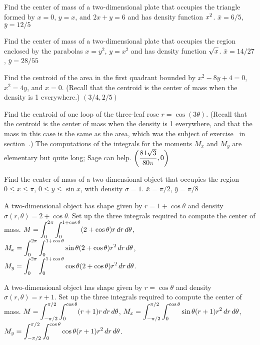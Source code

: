 \exercise Find the center of mass of a two-dimensional plate 
that occupies the triangle formed by $x=0$, $y=x$, and $2x+y=6$
and has density
function $\displaystyle x^2$.
\answer $\bar x=6/5$, $\bar y=12/5$
\endanswer
\endexercise

\exercise Find the center of mass of a two-dimensional plate 
that occupies the region enclosed by the parabolas $x=y^2$, $y=x^2$
and has density
function $\displaystyle\sqrt{x}$.
\answer $\bar x=14/27$, $\bar y=28/55$
\endanswer
\endexercise

\exercise Find the centroid of the area in the first quadrant bounded by
 $x^2-8y+4=0$, $x^2=4y$, and $x=0$. (Recall that the centroid
is the center of mass when the density is 1 everywhere.)
\answer $(3/4,2/5)$
\endanswer
\endexercise

\exercise Find the centroid of one loop of the three-leaf rose
$r=\cos(3\theta)$.  (Recall that the centroid is the
center of mass when the density is 1 everywhere, and that the mass in
this case is the same as the area, which was the subject of
exercise~ in
section~.)  The
computations of the integrals for the moments $M_x$ and $M_y$ are
elementary but quite long; Sage can help.
\answer $\displaystyle\left({81\sqrt3\over80\pi},0\right)$
\endanswer

\endexercise

\exercise Find the center of mass of a two dimensional
object that occupies the region $0\le x\le \pi$, $0\le y\le \sin x$,
with density $\sigma=1$.
\answer $\bar x=\pi/2$, $\bar y=\pi/8$ 
\endanswer
\endexercise

\exercise A two-dimensional object has shape given by 
$r=1+\cos\theta$ and density $\sigma(r,\theta)=2+\cos\theta$. Set up
the three integrals required to compute the center of mass.
\answer $\displaystyle M=\int_0^{2\pi} \int_0^{1+\cos\theta} (2+\cos\theta)r\,dr\,d\theta$,
\hfill\break
$\displaystyle M_x=\int_0^{2\pi} \int_0^{1+\cos\theta} \sin\theta(2+\cos\theta)r^2\,dr\,d\theta$,
\hfill\break
$\displaystyle M_y=\int_0^{2\pi} \int_0^{1+\cos\theta} \cos\theta(2+\cos\theta)r^2\,dr\,d\theta$.
\endanswer
\endexercise

\exercise A two-dimensional object has shape given by 
$r=\cos\theta$ and density $\sigma(r,\theta)=r+1$. Set up
the three integrals required to compute the center of mass.
\answer $\displaystyle M=\int_{-\pi/2}^{\pi/2} \int_0^{\cos\theta} (r+1)r\,dr\,d\theta$,
\hfill\break
$\displaystyle M_x=\int_{-\pi/2}^{\pi/2} \int_0^{\cos\theta} \sin\theta(r+1)r^2\,dr\,d\theta$,
\hfill\break
$\displaystyle M_y=\int_{-\pi/2}^{\pi/2} \int_0^{\cos\theta} \cos\theta(r+1)r^2\,dr\,d\theta$.
\endanswer
\endexercise

